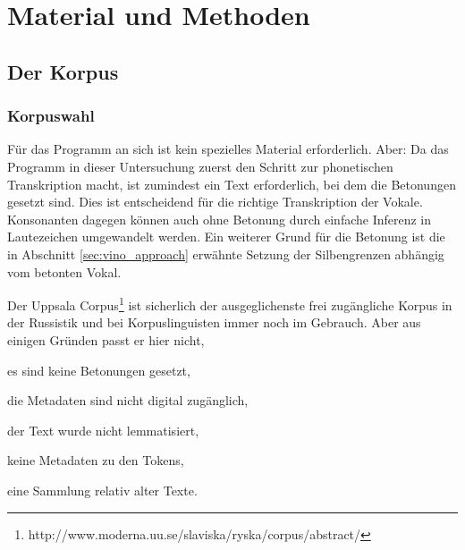 \documentclass[12pt,headsepline,a4paper]{scrartcl}
\newcommand\textcyr[1]{{\fontencoding{OT2}\fontfamily{wncyr}\selectfont #1}}
\begin{document}
% 

\newpage
\section{Material und Methoden}
\label{sec:mate_meth}

\subsection{Der Korpus}
\label{sec:corpus_pars}

\subsubsection{Korpuswahl}
Für das Programm an sich ist kein spezielles Material erforderlich. Aber: Da das Programm in dieser Untersuchung zuerst den Schritt zur phonetischen Transkription macht, ist zumindest ein Text erforderlich, bei dem die Betonungen gesetzt sind. Dies ist entscheidend für die richtige Transkription der Vokale. Konsonanten dagegen können auch ohne Betonung durch einfache Inferenz in Lautezeichen umgewandelt werden. Ein weiterer Grund für die Betonung ist die in Abschnitt \ref{sec:vino_approach} erwähnte Setzung der Silbengrenzen abhängig vom betonten Vokal.

Der Uppsala Corpus\footnote{http://www.moderna.uu.se/slaviska/ryska/corpus/abstract/} ist sicherlich der ausgeglichenste frei zugängliche Korpus in der Russistik und bei Korpuslinguisten immer noch im Gebrauch. Aber aus einigen Gründen passt er hier nicht,
\begin{inparaenum}[(1)]
\item es sind keine Betonungen gesetzt,
\item die Metadaten sind nicht digital zugänglich,
\item der Text wurde nicht lemmatisiert,
\item keine Metadaten zu den Tokens,
\item eine Sammlung relativ alter Texte.
\end{inparaenum} 
\end{document}
